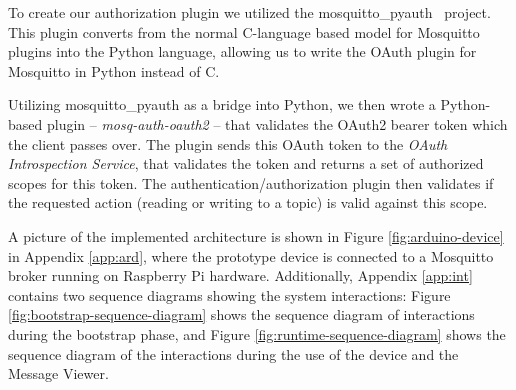 \documentclass{llncs}
\newif\iflong
\begin{document}
To create our authorization plugin we utilized the mosquitto\_pyauth~\cite{mosquitto-pyauth} project. This plugin converts from the normal
C-language based model for Mosquitto plugins into the Python language, allowing us to write the OAuth
plugin for Mosquitto in Python instead of C. 
\iflong
We did not assess the performance differences between writing in the native C model versus writing 
in Python as we were primarily aiming at experimenting with the model and the performance was adequate
for our tests. However, it would not be challenging to rewrite the plugin in pure C as most of the 
work is done by the remote Authorization Server. 
\fi

Utilizing mosquitto\_pyauth as a bridge into Python, we then wrote a Python-based plugin --
\emph{mosq-auth-oauth2} -- that validates the OAuth2 bearer token which the client passes over. 
The plugin sends this OAuth token to the \emph{OAuth Introspection Service}, 
that validates the token and returns a set of 
authorized scopes for this token. The authentication/authorization plugin then validates if 
the requested action (reading or writing to a topic) is valid against this scope.


A picture of the implemented architecture is shown in Figure \ref{fig:arduino-device} in Appendix \ref{app:ard}, where the prototype device is connected to a Mosquitto broker running on Raspberry Pi hardware.  Additionally, Appendix \ref{app:int} contains two sequence diagrams showing the system interactions: Figure \ref{fig:bootstrap-sequence-diagram} shows the sequence diagram of interactions during the bootstrap
phase, and Figure \ref{fig:runtime-sequence-diagram} shows the sequence diagram of the interactions during 
the use of the device and the Message Viewer.

\iflong
\end{document}
